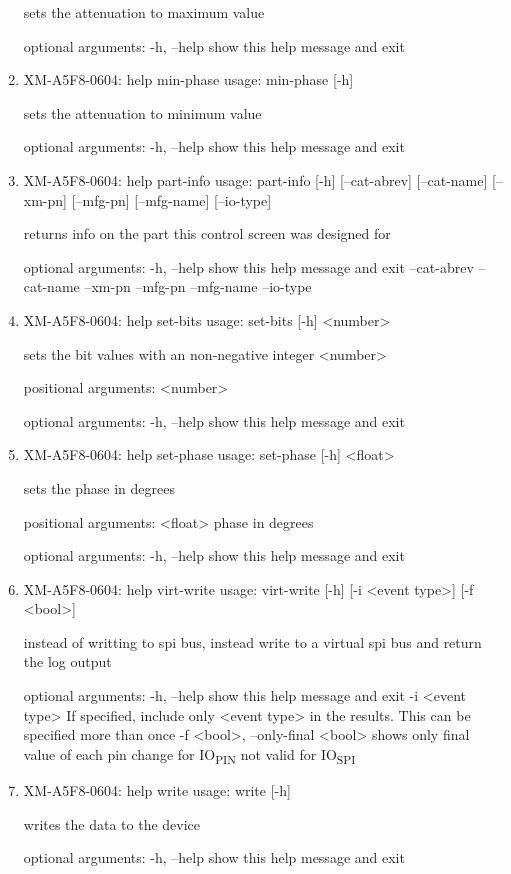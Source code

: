 \documentclass[11pt]{article}
\begin{document}
\begin{enumerate}
sets the attenuation to maximum value

optional arguments:
  -h, --help  show this help message and exit

\item XM-A5F8-0604: help min-phase
\label{sec:org0abc2d1}
usage: min-phase [-h]

sets the attenuation to minimum value

optional arguments:
  -h, --help  show this help message and exit

\item XM-A5F8-0604: help part-info
\label{sec:org2fdf797}
usage: part-info  [-h] [--cat-abrev] [--cat-name] [--xm-pn] [--mfg-pn] [--mfg-name]
        [--io-type]

returns info on the part this control screen was designed for

optional arguments:
  -h, --help   show this help message and exit
  --cat-abrev
  --cat-name
  --xm-pn
  --mfg-pn
  --mfg-name
  --io-type

\item XM-A5F8-0604: help set-bits
\label{sec:orgd4540a4}
usage: set-bits [-h] <number>

sets the bit values with an non-negative integer <number>

positional arguments:
  <number>

optional arguments:
  -h, --help  show this help message and exit

\item XM-A5F8-0604: help set-phase
\label{sec:orgcc694d3}
usage: set-phase [-h] <float>

sets the phase in degrees

positional arguments:
  <float>     phase in degrees

optional arguments:
  -h, --help  show this help message and exit

\item XM-A5F8-0604: help virt-write
\label{sec:org6b04c46}
usage: virt-write [-h] [-i <event type>] [-f <bool>]

instead of writting to spi bus, instead write to a virtual spi bus and return
the log output

optional arguments:
  -h, --help            show this help message and exit
  -i <event type>       If specified, include only <event type> in the
                        results. This can be specified more than once
  -f <bool>, --only-final <bool>
                        shows only final value of each pin change for IO\textsubscript{PIN}
                        not valid for IO\textsubscript{SPI}

\item XM-A5F8-0604: help write
\label{sec:org9fa397d}
usage: write [-h]

writes the data to the device

optional arguments:
  -h, --help  show this help message and exit
\end{enumerate}
\end{document}
